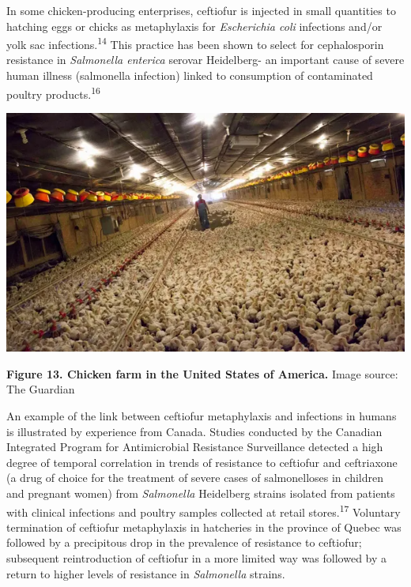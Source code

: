 \documentclass[
  11pt,
  paper=a4,
  ,captions=tableheading
]{scrartcl}
\begin{document}
In some chicken-producing enterprises, ceftiofur is injected in small
quantities to hatching eggs or chicks as metaphylaxis for
\emph{Escherichia coli} infections and/or yolk sac
infections.\textsuperscript{14} This practice has been shown to select
for cephalosporin resistance in \emph{Salmonella enterica} serovar
Heidelberg- an important cause of severe human illness (salmonella
infection) linked to consumption of contaminated poultry
products.\textsuperscript{16}

\includegraphics[width=6.25in,height=\textheight]{images/chicken_farm.png}

\textbf{Figure 13. Chicken farm in the United States of America.} Image
source: The Guardian

An example of the link between ceftiofur metaphylaxis and infections in
humans is illustrated by experience from Canada. Studies conducted by
the Canadian Integrated Program for Antimicrobial Resistance
Surveillance detected a high degree of temporal correlation in trends of
resistance to ceftiofur and ceftriaxone (a drug of choice for the
treatment of severe cases of salmonelloses in children and pregnant
women) from \emph{Salmonella} Heidelberg strains isolated from patients
with clinical infections and poultry samples collected at retail
stores.\textsuperscript{17} Voluntary termination of ceftiofur
metaphylaxis in hatcheries in the province of Quebec was followed by a
precipitous drop in the prevalence of resistance to ceftiofur;
subsequent reintroduction of ceftiofur in a more limited way was
followed by a return to higher levels of resistance in \emph{Salmonella}
strains.
\end{document}

